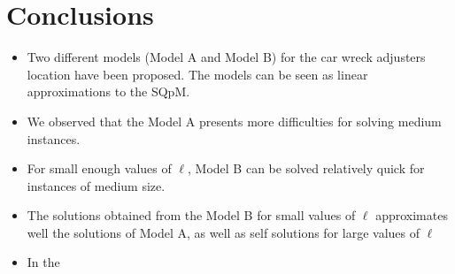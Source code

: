 \chapter{Conclusions}
\label{ch:Conclusions}
\begin{itemize}
\item Two different models (Model A and Model B)
  for the car wreck adjusters location have been proposed. 
  The models can be seen as linear approximations to the SQpM.
\item We observed that the Model A
  presents more difficulties for solving medium instances.
\item For small enough values of $\ell$,
  Model B can be solved relatively quick
  for instances of medium size.
\item The solutions obtained from the Model B
  for small values of $\ell$
  approximates well the solutions of Model A,
  as well as self solutions for large values of $\ell$
\item In the 
\end{itemize}

